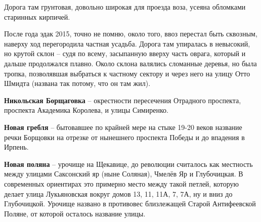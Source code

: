 Дорога там грунтовая, довольно широкая для проезда воза, усеяна обломками старинных кирпичей.

После года эдак 2015, точно не помню, около того, ввоз перестал быть сквозным, наверху ход перегородила частная усадьба. Дорога там упиралась в невысокий, но крутой склон – судя по всему, засыпанную вверху часть оврага, который и дальше продолжался плавно. Около склона валялись сломанные деревья, но была тропка, позволявшая выбраться к частному сектору и через него на улицу Отто Шмидта (названа так потому, что он там жил).\\

\medskip

\textbf{Никольская Борщаговка} – окрестности пересечения Отрадного проспекта, проспекта Академика Королева, и улицы Симиренко.\\

\medskip

\textbf{Новая гребля} – бытовавшее по крайней мере на стыке 19-20 веков название речки Борщовки на отрезке от нынешнего проспекта Победы и до впадения в Ирпень.\\

\medskip

\textbf{Новая поляна} – урочище на Щекавице, до революции считалось как местность между улицами Саксонский яр (ныне Соляная), Чмелёв Яр и Глубочицкая. В современных ориентирах это примерно место между такой петлей, которую делает улица Лукьяновская вокруг домов 13, 11, 11А, 7, 7А, ну и вниз до Глубочицкой. Урочище названо в противовес близлежащей Старой Антифеевской Поляне, от которой осталось название улицы.\\


